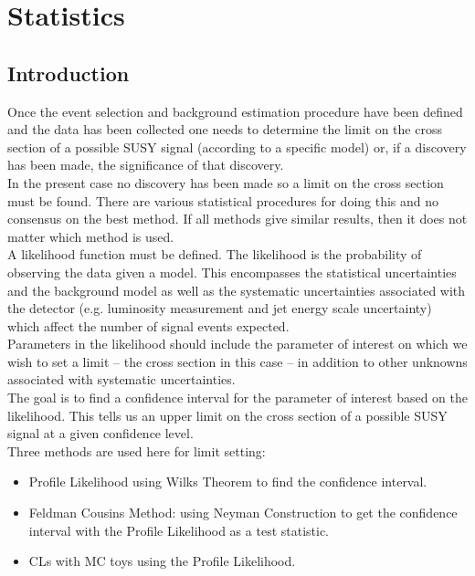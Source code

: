 \chapter{Statistics}

\section{Introduction}

Once the event selection and background estimation procedure have been defined
and the data has been collected one needs to determine the limit on the cross
section of a possible SUSY signal (according to a specific model) or, if a 
discovery has been made, the significance of that discovery. \\

In the present case no discovery has been made so a limit on the cross section
must be found. There are various statistical procedures for doing this and no 
consensus on the best method. If all methods give similar results, then it does
not matter which method is used. \\

A likelihood function must be defined. The likelihood is the probability of 
observing the data given a model. This encompasses the statistical uncertainties
and the background model as well as the systematic uncertainties associated
with the detector (e.g. luminosity measurement and jet energy scale uncertainty)
which affect the number of signal events expected. \\

Parameters in the likelihood should include the parameter of interest on which 
we wish to set a limit -- the cross section in this case -- in addition to
other unknowns associated with systematic uncertainties. \\

The goal is to find a confidence interval for the parameter of interest based
on the likelihood. This tells us an upper limit on the cross section of a
 possible SUSY signal at a given confidence level. \\

Three methods are used here for limit setting:
\begin{itemize}
\item Profile Likelihood using Wilks Theorem to find the confidence interval.
\item Feldman Cousins Method: using Neyman Construction to get the confidence 
interval with the Profile Likelihood as a test statistic.
\item CLs with MC toys using the Profile Likelihood.
\end{itemize}

